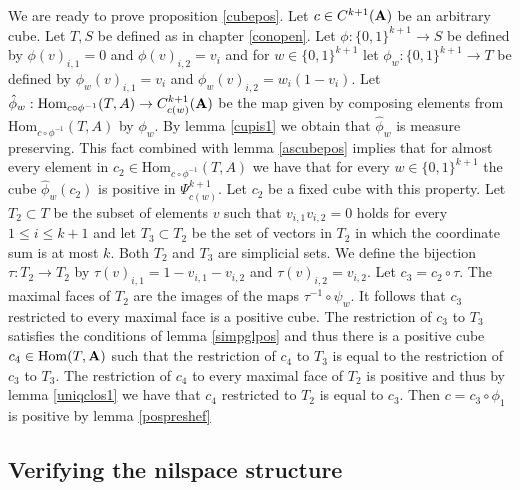 \documentclass [11pt] {article}
\newcommand{\Hom}{\mathrm{Hom}}
\def\bA{{\bf A}}
\begin{document}
\medskip

We are ready to prove proposition \ref{cubepos}. Let $c\in C^{k+1}(\bA)$ be an arbitrary cube.
Let $T,S$ be defined as in chapter \ref{conopen}. Let $\phi:\{0,1\}^{k+1}\rightarrow S$ be defined by $\phi(v)_{i,1}=0$ and $\phi(v)_{i,2}=v_i$ and for $w\in\{0,1\}^{k+1}$ let $\phi_w:\{0,1\}^{k+1}\rightarrow T$ be defined by $\phi_w(v)_{i,1}=v_i$ and $\phi_w(v)_{i,2}=w_i(1-v_i)$. Let $\hat{\phi}_w:\Hom_{c\circ\phi^{-1}}(T,A)\rightarrow C_{c(w)}^{k+1}(\bA)$ be the map given by composing elements from $\Hom_{c\circ\phi^{-1}}(T,A)$ by $\phi_w$.  By lemma \ref{cupis1} we obtain that $\hat{\phi}_w$ is measure preserving. This fact combined with lemma \ref{ascubepos} implies that for almost every element in $c_2\in\Hom_{c\circ\phi^{-1}}(T,A)$ we have that for every $w\in\{0,1\}^{k+1}$ the cube $\hat{\phi}_w(c_2)$ is positive in $\Psi_{c(w)}^{k+1}$. Let $c_2$ be a fixed cube with this property. 
Let $T_2\subset T$ be the subset of elements $v$ such that  $v_{i,1}v_{i,2}=0$ holds for every $1\leq i\leq k+1$ and let $T_3\subset T_2$ be the set of vectors in $T_2$ in which the coordinate sum is at most $k$. Both $T_2$ and $T_3$ are simplicial sets. 
We define the bijection $\tau:T_2\rightarrow T_2$ by $\tau(v)_{i,1}=1-v_{i,1}-v_{i,2}$ and $\tau(v)_{i,2}=v_{i,2}$. Let $c_3=c_2\circ\tau$. The maximal faces of $T_2$ are the images of the maps $\tau^{-1}\circ\psi_w$. It follows that $c_3$ restricted to every maximal face is a positive cube.
The restriction of $c_3$ to $T_3$ satisfies the conditions of lemma \ref{simpglpos} and thus there is a positive cube $c_4\in\Hom(T,\bA)$ such that the restriction of $c_4$ to $T_3$ is equal to the restriction of $c_3$ to $T_3$.
The restriction of $c_4$ to every maximal face of $T_2$ is positive and thus by lemma \ref{uniqclos1} we have that $c_4$ restricted to $T_2$ is equal to $c_3$. Then $c=c_3\circ\phi_1$ is positive by lemma \ref{pospreshef}

\medskip 

\subsection{Verifying the nilspace structure}
\end{document}
